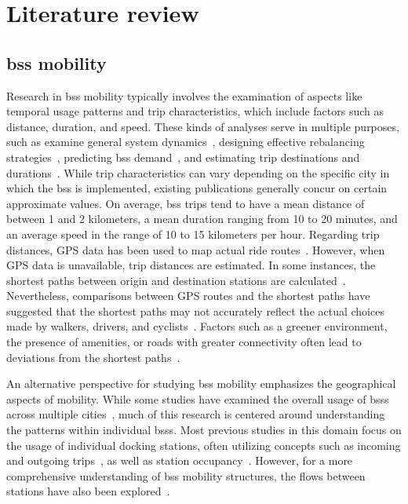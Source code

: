 \section{Literature review}

\subsection[BSS mobility]{\ac{bss} mobility}

Research in \ac{bss} mobility typically involves the examination of aspects like temporal usage patterns and trip characteristics, which include factors such as distance, duration, and speed. These kinds of analyses serve in multiple purposes, such as examine general system dynamics~\cite{Jensen2010, Ciancia2015, Zaltz2013}, designing effective rebalancing strategies~\cite{Chiariotti2018}, predicting \ac{bss} demand~\cite{Borgnat2011}, and estimating trip destinations and durations~\cite{Zhang2016Bicycle}. While trip characteristics can vary depending on the specific city in which the \ac{bss} is implemented, existing publications generally concur on certain approximate values. On average, \ac{bss} trips tend to have a mean distance of between 1 and 2 kilometers, a mean duration ranging from 10 to 20 minutes, and an average speed in the range of 10 to 15 kilometers per hour. Regarding trip distances, GPS data has been used to map actual ride routes~\cite{Talavera_Garcia2021}. However, when GPS data is unavailable, trip distances are estimated. In some instances, the shortest paths between origin and destination stations are calculated~\cite{Oliveira2016}. Nevertheless, comparisons between GPS routes and the shortest paths have suggested that the shortest paths may not accurately reflect the actual choices made by walkers, drivers, and cyclists~\cite{Zhu2015, Lu2018, Klein2023}. Factors such as a greener environment, the presence of amenities, or roads with greater connectivity often lead to deviations from the shortest paths~\cite{Klein2023}.

An alternative perspective for studying \ac{bss} mobility emphasizes the geographical aspects of mobility. While some studies have examined the overall usage of \acp{bss} across multiple cities~\cite{Zhao2014, DuranRodas2019, Sarkar2015}, much of this research is centered around understanding the patterns within individual \acp{bss}. Most previous studies in this domain focus on the usage of individual docking stations, often utilizing concepts such as incoming and outgoing trips~\cite{Moncayo2016, FaghihImani2014, Wang2016, FaghihImani2017Empirical, DuranRodas2019, Oliveira2016}, as well as station occupancy~\cite{OBrien2014, Sarkar2015}. However, for a more comprehensive understanding of \ac{bss} mobility structures, the flows between stations have also been explored~\cite{Corcoran2014, Yang2019, Kon2021}.


